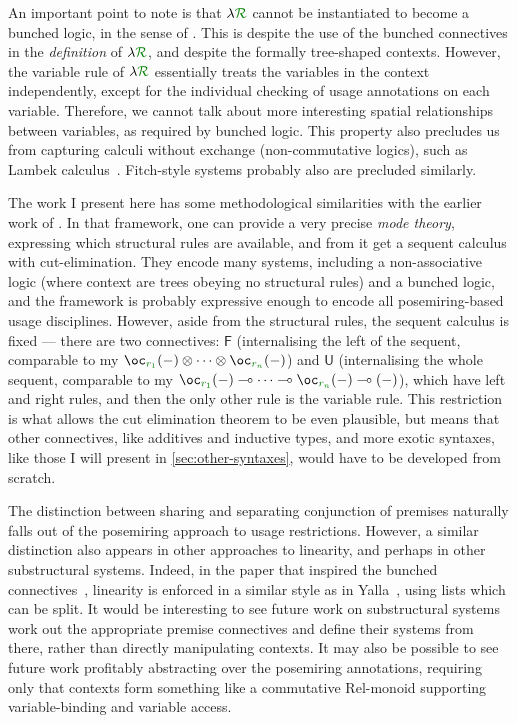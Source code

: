 An important point to note is that $\name$ cannot be instantiated to become a
bunched logic, in the sense of \citet{oHP99}.
This is despite the use of the bunched connectives in the \emph{definition} of
$\name$, and despite the formally tree-shaped contexts.
However, the variable rule of $\name$ essentially treats the variables in the
context independently, except for the individual checking of usage annotations
on each variable.
Therefore, we cannot talk about more interesting spatial relationships between
variables, as required by bunched logic.
This property also precludes us from capturing calculi without exchange
(non-commutative logics), such as Lambek calculus~\citep{Lambek58}.
Fitch-style systems probably also are precluded similarly.

The work I present here has some methodological similarities with the earlier
work of \citet{LicataSR17}.
In that framework, one can provide a very precise \emph{mode theory}, expressing
which structural rules are available, and from it get a sequent calculus with
cut-elimination.
They encode many systems, including a non-associative logic (where context are
trees obeying no structural rules) and a bunched logic, and the framework is
probably expressive enough to encode all posemiring-based usage disciplines.
However, aside from the structural rules, the sequent calculus is fixed ---
there are two connectives: $\mathsf F$ (internalising the left of the sequent,
comparable to my
$\oc_{\gr{r_1}}\plr{-} \otimes \cdots \otimes \oc_{\gr{r_n}}\plr{-}$) and
$\mathsf U$ (internalising the whole sequent, comparable to my
$\oc_{\gr{r_1}}\plr{-} \multimap \cdots \multimap \oc_{\gr{r_n}}\plr{-}
\multimap \plr{-}$), which have left and right rules, and then the only other
rule is the variable rule.
This restriction is what allows the cut elimination theorem to be even
plausible, but means that other connectives, like additives and inductive types,
and more exotic syntaxes, like those I will present in
\cref{sec:other-syntaxes}, would have to be developed from scratch.

The distinction between sharing and separating conjunction of premises naturally
falls out of the posemiring approach to usage restrictions.
However, a similar distinction also appears in other approaches to linearity,
and perhaps in other substructural systems.
Indeed, in the paper that inspired the bunched connectives~\citep{RPKV20},
linearity is enforced in a similar style as in Yalla~\citep{laurent18}, using
lists which can be split.
It would be interesting to see future work on substructural systems work out the
appropriate premise connectives and define their systems from there, rather than
directly manipulating contexts.
It may also be possible to see future work profitably abstracting over the
posemiring annotations, requiring only that contexts form something like a
commutative $\mathrm{Rel}$-monoid supporting variable-binding and
variable access.
